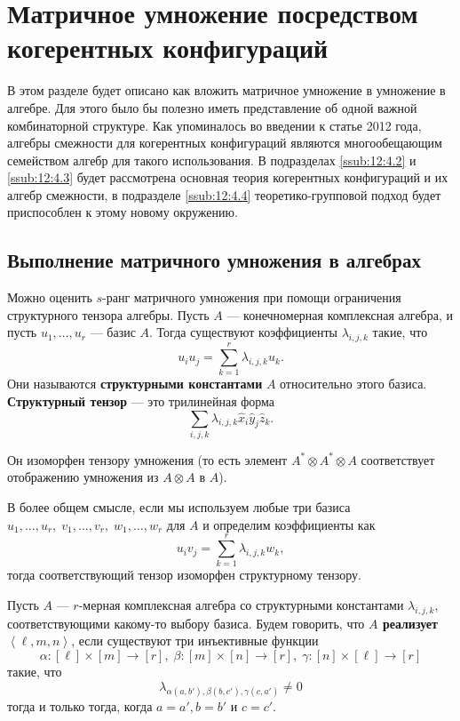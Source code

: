 \section{Матричное умножение посредством когерентных конфигураций}

В этом разделе будет описано как вложить матричное умножение в умножение в алгебре. Для этого было бы полезно иметь представление об одной важной комбинаторной структуре. Как упоминалось во введении к статье 2012 года, алгебры смежности для когерентных конфигураций являются многообещающим семейством алгебр для такого использования. В подразделах \ref{ssub:12:4.2} и \ref{ssub:12:4.3} будет рассмотрена основная теория когерентных конфигураций и их алгебр смежности, в подразделе \ref{ssub:12:4.4} теоретико-групповой подход будет приспособлен к этому новому окружению.

\subsection{Выполнение матричного умножения в алгебрах}
	
Можно оценить $s$-ранг матричного умножения при помощи ограничения структурного тензора алгебры. Пусть $A$ --- конечномерная комплексная алгебра, и пусть $u_1, \dotsc, u_r$ --- базис $A$. Тогда существуют коэффициенты $\lambda_{i,j,k}$ такие, что 
\[
	u_i u_j = \sum_{k=1}^r \lambda_{i,j,k} u_k.
\]
Они называются \textbf{структурными константами} $A$ относительно этого базиса. \textbf{Структурный тензор} --- это трилинейная форма
\[
	\sum_{i,j,k} \lambda_{i,j,k} \widehat{x}_i \widehat{y}_j \widehat{z}_k.
\]

Он изоморфен тензору умножения (то есть элемент $A^* \otimes A^* \otimes A$ соответствует отображению умножения из $A \otimes A$ в $A$). 

В более общем смысле, если мы используем любые три базиса $u_1, \dotsc, u_r, \; v_1, \dotsc, v_r, \; w_1, \dots, w_r$ для $A$ и определим коэффициенты как 
\[
	u_i v_j = \sum_{k=1}^r \lambda_{i,j,k} w_k,
\]
тогда соответствующий тензор изоморфен структурному тензору.
\begin{definition}\label{def:12:4.1}
   Пусть $A$ --- $r$-мерная комплексная алгебра со структурными константами $\lambda_{i,j,k}$, соответствующими какому-то выбору базиса. Будем говорить, что \textbf{$A$ реализует} $\left\langle \ell, m, n \right\rangle$, если существуют три инъективные функции
   \[
   	\alpha: [\ell] \times [m] \to [r], \; \beta: [m] \times [n] \to [r], \; \gamma: [n] \times [\ell] \to [r]
   \]
   такие, что 
   \[
   	\lambda_{\alpha(a,b'), \beta(b,c'), \gamma(c,a')} \neq 0
   \]
   тогда и только тогда, когда $a=a',b=b'$ и $c=c'$.
\end{definition}


